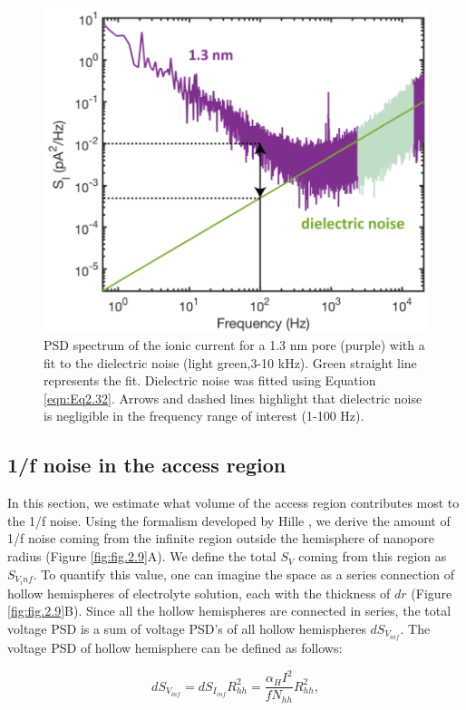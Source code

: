 \begin{figure}[H]
	\centering
	\includegraphics[width=0.7\linewidth]{figures/Figure2.8.png}
	\caption{PSD spectrum of the ionic current for a 1.3 nm pore (purple) with a fit to the dielectric noise (light green,3-10 kHz). Green straight line represents the fit. Dielectric noise was fitted using Equation \ref{eqn:Eq2.32}. Arrows and dashed lines highlight that dielectric noise is negligible in the frequency range of interest (1-100 Hz).}
	\label{fig:fig.2.8}
\end{figure}

\subsection{1/f noise in the access region}\label{sec:S2.4.6}

In this section, we estimate what volume of the access region contributes most to the 1/f noise. Using the formalism developed by Hille \cite{Hille1968}, we derive the amount of 1/f noise coming from the infinite region outside the hemisphere of nanopore radius (Figure \ref{fig:fig.2.9}A). We define the total $S_V$ coming from this region as $S_{V_inf}$. To quantify this value, one can imagine the space as a series connection of hollow hemispheres of electrolyte solution, each with the thickness of $dr$ (Figure \ref{fig:fig.2.9}B). Since all the hollow hemispheres are connected in series, the total voltage PSD is a sum of voltage PSD’s of all hollow hemispheres $dS_{V_{inf}}$. The voltage PSD of hollow hemisphere can be defined as follows:

\begin{equation}\label{eqn:Eq2.33}
dS_{V_{inf}}=dS_{I_{inf}}R_{hh}^2=\frac{\alpha_HI^2}{fN_{hh}}R_{hh}^2,
\end{equation}


